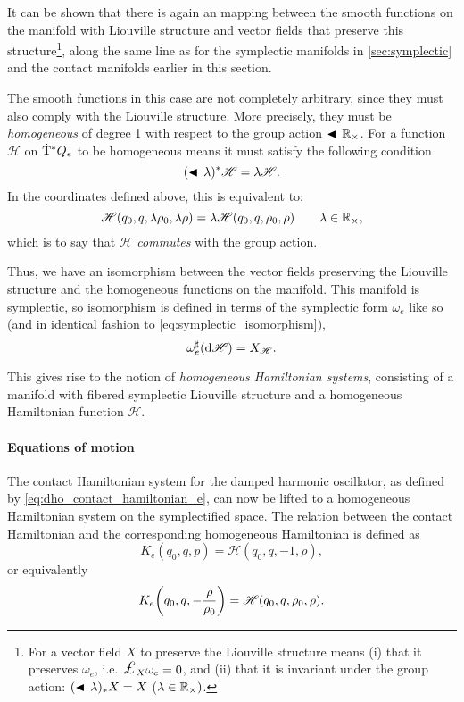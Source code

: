 It can be shown that there is again an mapping between the smooth functions on the manifold with Liouville structure and vector fields that preserve this structure\footnote
{For a vector field $X$ to preserve the Liouville structure means (i) that it preserves $\omega_e$, i.e. $\lied{X}{\omega_e} = 0$, and (ii) that it is invariant under the group action: $ (\blacktriangleleft\,\lambda)_* X = X$ ($\lambda \in \mathbb{R}_{\times})$. }, along the same line as for the symplectic manifolds in \cref{sec:symplectic} and the contact manifolds earlier in this section.

The smooth functions in this case are not completely arbitrary, since they must also comply with the Liouville structure. More precisely, they must be \emph{homogeneous} of degree 1 with respect to the group action $\blacktriangleleft\,\mathbb{R}_{\times}$. For a function $\mathscr{H}$ on $\mathrm{\dot{T}}^*Q_e$ to be homogeneous means it must satisfy the following condition
$$ (\blacktriangleleft\,\lambda )^* \mathscr{H} = \lambda \mathscr{H}. $$
In the coordinates defined above, this is equivalent to:
$$ \mathscr{H}(q_0, q, \lambda \rho_0, \lambda \rho) = \lambda\mathscr{H}(q_0, q, \rho_0, \rho) \qquad \lambda \in \mathbb{R}_{\times},$$
which is to say that $\mathscr{H}$ \emph{commutes} with the group action.

Thus, we have an isomorphism between the vector fields preserving the Liouville structure and the homogeneous functions on the manifold. 
This manifold is symplectic, so isomorphism is defined in terms of the symplectic form $\omega_e$ like so (and in identical fashion to \cref{eq:symplectic_isomorphism}),
$$ \omega_e^\sharp(\dd{\mathscr{H}}) = X_\mathscr{H}. $$

This gives rise to the notion of \emph{homogeneous Hamiltonian systems}, consisting of a manifold with fibered symplectic Liouville structure and a homogeneous Hamiltonian function $\mathscr{H}$.

\paragraph{Equations of motion} The contact Hamiltonian system for the damped harmonic oscillator, as defined by \cref{eq:dho_contact_hamiltonian_e}, can now be lifted to a homogeneous Hamiltonian system on the symplectified space. The relation between the contact Hamiltonian and the corresponding homogeneous Hamiltonian is defined as \cite{VanderSchaft2021a,Libermann1987,Arnold1989}
$$ K_e(q_0, q, p) = \mathscr{H}(q_0, q, -1, \rho), $$
or equivalently
\begin{equation}
    K_e\qty(q_0, q, -\frac{\rho}{\rho_0}) = \mathscr{H}(q_0, q, \rho_0, \rho). 
    \label{eq:H_contact_homo}
\end{equation}

